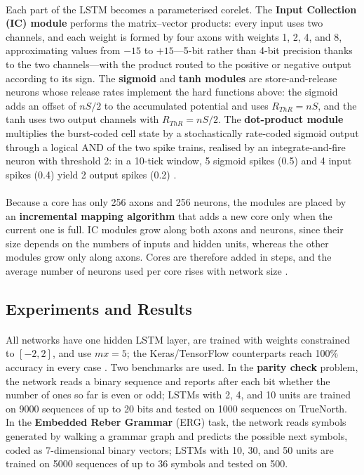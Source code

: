 \documentclass[12pt,a4paper,final]{extreport}
\begin{document}
\paragraph{} Each part of the LSTM becomes a parameterised corelet. The \textbf{Input Collection (IC) module} performs the matrix--vector products: every input uses two channels, and each weight is formed by four axons with weights 1, 2, 4, and 8, approximating values from $-15$ to $+15$---5-bit rather than 4-bit precision thanks to the two channels---with the product routed to the positive or negative output according to its sign. The \textbf{sigmoid} and \textbf{tanh modules} are store-and-release neurons whose release rates implement the hard functions above: the sigmoid adds an offset of $nS/2$ to the accumulated potential and uses $R_{ThR}=nS$, and the tanh uses two output channels with $R_{ThR}=nS/2$. The \textbf{dot-product module} multiplies the burst-coded cell state by a stochastically rate-coded sigmoid output through a logical AND of the two spike trains, realised by an integrate-and-fire neuron with threshold 2: in a 10-tick window, 5 sigmoid spikes (0.5) and 4 input spikes (0.4) yield 2 output spikes (0.2) \cite{p3}.

\paragraph{} Because a core has only 256 axons and 256 neurons, the modules are placed by an \textbf{incremental mapping algorithm} that adds a new core only when the current one is full. IC modules grow along both axons and neurons, since their size depends on the numbers of inputs and hidden units, whereas the other modules grow only along axons. Cores are therefore added in steps, and the average number of neurons used per core rises with network size \cite{p3}.

\subsection{Experiments and Results}

\paragraph{} All networks have one hidden LSTM layer, are trained with weights constrained to $[-2,2]$, and use $mx=5$; the Keras/TensorFlow counterparts reach 100\% accuracy in every case \cite{p3}. Two benchmarks are used. In the \textbf{parity check} problem, the network reads a binary sequence and reports after each bit whether the number of ones so far is even or odd; LSTMs with 2, 4, and 10 units are trained on 9000 sequences of up to 20 bits and tested on 1000 sequences on TrueNorth. In the \textbf{Embedded Reber Grammar} (ERG) task, the network reads symbols generated by walking a grammar graph and predicts the possible next symbols, coded as 7-dimensional binary vectors; LSTMs with 10, 30, and 50 units are trained on 5000 sequences of up to 36 symbols and tested on 500.
\end{document}
